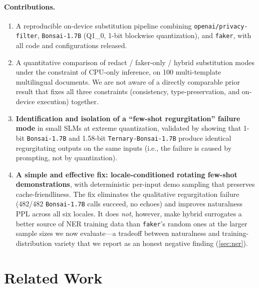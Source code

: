 \documentclass[11pt]{article}
\newcommand{\code}[1]{\texttt{#1}}
\newcommand{\openaipf}{\code{openai/privacy-filter}}
\newcommand{\bonsai}{\code{Bonsai-1.7B}}
\newcommand{\ternary}{\code{Ternary-Bonsai-1.7B}}
\newcommand{\faker}{\code{faker}}
\begin{document}
\paragraph{Contributions.}
\begin{enumerate}[leftmargin=*, itemsep=2pt, topsep=2pt]
  \item A reproducible on-device substitution pipeline combining
        \openaipf{}, \bonsai{} (Q1\_0, 1-bit blockwise quantization),
        and \faker{}, with all code and configurations released.
  \item A quantitative comparison of redact / faker-only / hybrid
        substitution modes under the constraint of CPU-only inference,
        on 100 multi-template multilingual documents. We are not aware
        of a directly comparable prior result that fixes all three
        constraints (consistency, type-preservation, and on-device
        execution) together.
  \item \textbf{Identification and isolation of a ``few-shot
        regurgitation'' failure mode} in small SLMs at extreme
        quantization, validated by showing that 1-bit \bonsai{} and
        1.58-bit \ternary{} produce identical regurgitating outputs on
        the same inputs (i.e., the failure is caused by prompting, not
        by quantization).
  \item \textbf{A simple and effective fix: locale-conditioned rotating
        few-shot demonstrations}, with deterministic per-input demo
        sampling that preserves cache-friendliness. The fix eliminates
        the qualitative regurgitation failure (482/482 \bonsai{} calls
        succeed, no echoes) and improves naturalness PPL across all six
        locales. It does \emph{not}, however, make hybrid surrogates a
        better source of NER training data than \faker{}'s random ones
        at the larger sample sizes we now evaluate---a tradeoff between
        naturalness and training-distribution variety that we report as
        an honest negative finding (\cref{sec:ner}).
\end{enumerate}

\section{Related Work}
\label{sec:related}
\end{document}
